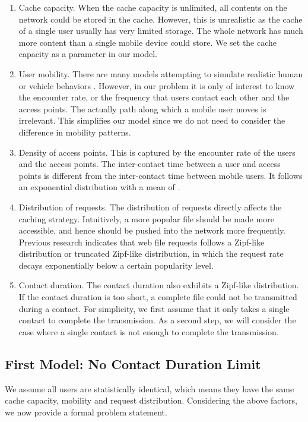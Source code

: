 \documentclass{sig-alternate}
\begin{document}
\begin{enumerate}
	\item Cache capacity. When the cache capacity is unlimited, all contents on the network could be stored in the cache. However, this is unrealistic as the cache of a single user usually has very limited storage. The whole network has much more content than a single mobile device could store. We set the cache capacity as a parameter in our model.
	
	\item User mobility. There are many models attempting to simulate realistic human or vehicle behaviors \cite{hsu2007modeling} \cite{gonzalez2008understanding}. However, in our problem it is only of interest to know the encounter rate, or the frequency that users contact each other and the access points. The actually path along which a mobile user moves is irrelevant. This simplifies our model since we do not need to consider the difference in mobility patterns. 
	
	\item Density of access points. This is captured by the encounter rate  of the users and the access points. The inter-contact time between a user and access points is different from the inter-contact time between mobile users. It follows an exponential distribution with a mean of . 
	
	\item Distribution of requests. The distribution of requests directly affects the caching strategy. Intuitively, a more popular file should be made more accessible, and hence should be pushed into the network more frequently. Previous research indicates that web file requests follows a Zipf-like distribution \cite{breslau1999web} or truncated Zipf-like distribution, in which the request rate decays exponentially below a certain popularity level. 
	
	\item Contact duration. The contact duration also exhibits a Zipf-like distribution. If the contact duration is too short, a complete file could not be transmitted during a contact. For simplicity, we first assume that it only takes a single contact to complete the transmission. As a second step, we will consider the case where a single contact is not enough to complete the transmission.
\end{enumerate}

\subsection{First Model: No Contact Duration Limit}
We assume all users are statistically identical, which means they have the same cache capacity, mobility and request distribution. 
Considering the above factors, we now provide a formal problem statement.
\end{document}
